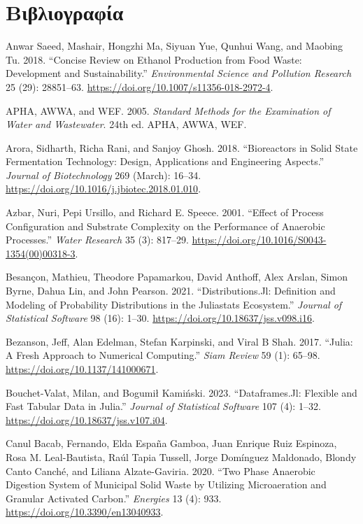 \documentclass[11pt]{report}
\begin{document}
\part*{Βιβλιογραφία}
\label{sec:org5b8b235}
\begin{hangparas}{1.5em}{1}
\hypertarget{citeproc_bib_item_1}{Anwar Saeed, Mashair, Hongzhi Ma, Siyuan Yue, Qunhui Wang, and Maobing Tu. 2018. “Concise Review on Ethanol Production from Food Waste: Development and Sustainability.” \textit{Environmental Science and Pollution Research} 25 (29): 28851–63. \url{https://doi.org/10.1007/s11356-018-2972-4}.}

\hypertarget{citeproc_bib_item_2}{APHA, AWWA, and WEF. 2005. \textit{Standard Methods for the Examination of Water and Wastewater}. 24th ed. APHA, AWWA, WEF.}

\hypertarget{citeproc_bib_item_3}{Arora, Sidharth, Richa Rani, and Sanjoy Ghosh. 2018. “Bioreactors in Solid State Fermentation Technology: Design, Applications and Engineering Aspects.” \textit{Journal of Biotechnology} 269 (March): 16–34. \url{https://doi.org/10.1016/j.jbiotec.2018.01.010}.}

\hypertarget{citeproc_bib_item_4}{Azbar, Nuri, Pepi Ursillo, and Richard E. Speece. 2001. “Effect of Process Configuration and Substrate Complexity on the Performance of Anaerobic Processes.” \textit{Water Research} 35 (3): 817–29. \url{https://doi.org/10.1016/S0043-1354(00)00318-3}.}

\hypertarget{citeproc_bib_item_5}{Besançon, Mathieu, Theodore Papamarkou, David Anthoff, Alex Arslan, Simon Byrne, Dahua Lin, and John Pearson. 2021. “Distributions.Jl: Definition and Modeling of Probability Distributions in the Juliastats Ecosystem.” \textit{Journal of Statistical Software} 98 (16): 1–30. \url{https://doi.org/10.18637/jss.v098.i16}.}

\hypertarget{citeproc_bib_item_6}{Bezanson, Jeff, Alan Edelman, Stefan Karpinski, and Viral B Shah. 2017. “Julia: A Fresh Approach to Numerical Computing.” \textit{Siam Review} 59 (1): 65–98. \url{https://doi.org/10.1137/141000671}.}

\hypertarget{citeproc_bib_item_7}{Bouchet-Valat, Milan, and Bogumił Kamiński. 2023. “Dataframes.Jl: Flexible and Fast Tabular Data in Julia.” \textit{Journal of Statistical Software} 107 (4): 1–32. \url{https://doi.org/10.18637/jss.v107.i04}.}

\hypertarget{citeproc_bib_item_8}{Canul Bacab, Fernando, Elda España Gamboa, Juan Enrique Ruiz Espinoza, Rosa M. Leal-Bautista, Raúl Tapia Tussell, Jorge Domínguez Maldonado, Blondy Canto Canché, and Liliana Alzate-Gaviria. 2020. “Two Phase Anaerobic Digestion System of Municipal Solid Waste by Utilizing Microaeration and Granular Activated Carbon.” \textit{Energies} 13 (4): 933. \url{https://doi.org/10.3390/en13040933}.}


\end{hangparas}
\end{document}
